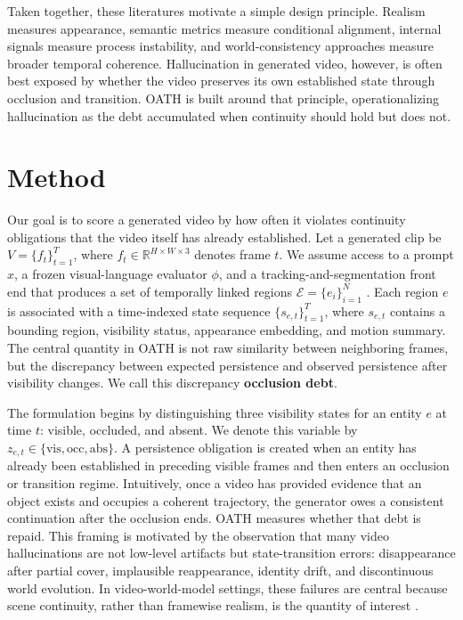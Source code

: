 \documentclass{article}
\begin{document}
Taken together, these literatures motivate a simple design principle. Realism measures appearance, semantic metrics measure conditional alignment, internal signals measure process instability, and world-consistency approaches measure broader temporal coherence. Hallucination in generated video, however, is often best exposed by whether the video preserves its own established state through occlusion and transition. OATH is built around that principle, operationalizing hallucination as the debt accumulated when continuity should hold but does not.

\section{Method}

Our goal is to score a generated video by how often it violates continuity obligations that the video itself has already established. Let a generated clip be \(V=\{f_t\}_{t=1}^T\), where \(f_t \in \mathbb{R}^{H \times W \times 3}\) denotes frame \(t\). We assume access to a prompt \(x\), a frozen visual-language evaluator \(\phi\), and a tracking-and-segmentation front end that produces a set of temporally linked regions \(\mathcal{E}=\{e_i\}_{i=1}^N\) \cite{clip2021,blip2_2023,sam2023,xmem2022,bytetrack2022}. Each region \(e\) is associated with a time-indexed state sequence \(\{s_{e,t}\}_{t=1}^T\), where \(s_{e,t}\) contains a bounding region, visibility status, appearance embedding, and motion summary. The central quantity in OATH is not raw similarity between neighboring frames, but the discrepancy between expected persistence and observed persistence after visibility changes. We call this discrepancy \textbf{occlusion debt}.

The formulation begins by distinguishing three visibility states for an entity \(e\) at time \(t\): visible, occluded, and absent. We denote this variable by \(z_{e,t} \in \{\mathrm{vis}, \mathrm{occ}, \mathrm{abs}\}\). A persistence obligation is created when an entity has already been established in preceding visible frames and then enters an occlusion or transition regime. Intuitively, once a video has provided evidence that an object exists and occupies a coherent trajectory, the generator owes a consistent continuation after the occlusion ends. OATH measures whether that debt is repaid. This framing is motivated by the observation that many video hallucinations are not low-level artifacts but state-transition errors: disappearance after partial cover, implausible reappearance, identity drift, and discontinuous world evolution. In video-world-model settings, these failures are central because scene continuity, rather than framewise realism, is the quantity of interest \cite{dreamdojo2026,genie2024,worldsim2024}.
\end{document}
